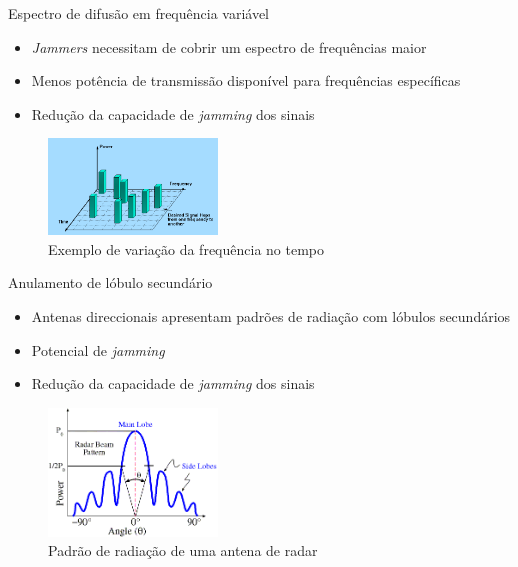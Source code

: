 \documentclass[portuguese,10pt]{beamer}
\begin{document}
\begin{frame}{Espectro de difusão em frequência variável}
    \begin{itemize}
    \item \textit{Jammers} necessitam de cobrir um espectro de frequências maior
    \item Menos potência de transmissão disponível para frequências específicas
    \item Redução da capacidade de \textit{jamming} dos sinais
    \end{itemize}
    \begin{figure}[ht]
\centering
\includegraphics[width=0.4\textwidth]{graphics/frequency_hopping.png}
\caption{Exemplo de variação da frequência no tempo}
\label{frequency_hopping}
\end{figure}
\end{frame}

\begin{frame}{Anulamento de lóbulo secundário}
    \begin{itemize}
    \item<1-> Antenas direccionais apresentam padrões de radiação com lóbulos secundários
    \item<2-> Potencial de \textit{jamming}
    \item<3-> Redução da capacidade de \textit{jamming} dos sinais
    \end{itemize}
    \begin{figure}[ht]
\centering
\includegraphics[width=0.4\textwidth]{graphics/radar_antenna_lobes.png}
\caption{Padrão de radiação de uma antena de radar}
\label{radiation_pattern}
\end{figure}
\end{frame}
\end{document}
